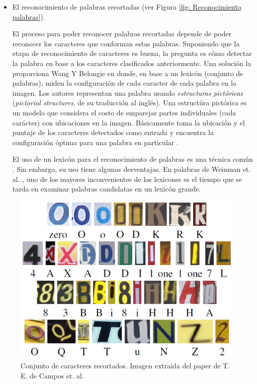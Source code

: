 \begin{itemize}
		
		\item El reconocimiento de palabras recortadas (ver Figura \ref{fig: Reconocimiento palabras}).

		El proceso para poder reconocer palabras recortadas depende de poder reconocer los caracteres que conforman estas palabras. Suponiendo que la etapa de reconocimiento de caracteres es buena, la pregunta es cómo detectar la palabra en base a los caracteres clasificados anteriormente. Una solución la proporciona Wang Y Belongie en \cite{WB10} donde, en base a un lexicón (conjunto de palabras), miden la configuración de cada caracter de cada palabra en la imagen. Los autores representan una palabra usando \textit{estructuras pictóricas} (\textit{pictorial structures}, de su traducción al inglés). Una estructúra pictórica es un modelo que considera el costo de emparejar partes individuales (cada carácter) con ubicaciones en la imagen. Básicamente toma la ubicación y el puntaje de los caracteres detectados como entrada y encuentra la configuración óptima para una palabra en particular \cite{wang}.	
		
		El uso de un lexicón para el reconocimiento de palabras es una técnica común \cite{WWI1959}\cite{CPPJ05}. Sin embargo, su uso tiene algunas desventajas. En palabras de Weinman et. al. \cite{JEA}, uno de los mayores inconvenientes de los lexicones es el tiempo que se tarda en examinar palabras candidatas en un lexicón grande.
		
	\end{itemize}
	
	\begin{figure}[htbp]
		\centering
  		\centerline{ \includegraphics[scale=0.5]{img/hog/confusing_english.png} }
		\caption[Clasificación de caracteres recortados]{Conjunto de caracteres recortados. Imagen extraida del paper de T. E. de Campos et. al. \cite{dCBV09}}
		\label{fig: Caracteres recortados}
	\end{figure}
	

